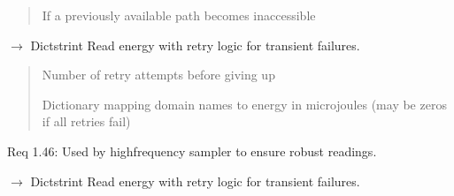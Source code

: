 \documentclass[letterpaper,10pt,english]{sphinxmanual}
\begin{document}
\begin{fulllineitems}
\begin{fulllineitems}
\begin{quote}
\begin{description}
\sphinxAtStartPar
{} \textendash{} If a previously available path becomes inaccessible

\end{description}\end{quote}

\end{fulllineitems}


\begin{fulllineitems}
\label{\detokenize{core.readers.rapl_reader:core.readers.rapl_reader.RAPLReader.read_energy_safe}}
\pysigstartsignatures
\pysiglinewithargsret
{}
{}
{{ $\rightarrow$ Dict\DUrole{p}{{[}}strint\DUrole{p}{{]}}}}
\pysigstopsignatures
\sphinxAtStartPar
Read energy with retry logic for transient failures.
\begin{quote}\begin{description}
\sphinxAtStartPar
{} \textendash{} Number of retry attempts before giving up

\sphinxAtStartPar
Dictionary mapping domain names to energy in microjoules
(may be zeros if all retries fail)

\end{description}\end{quote}

\sphinxAtStartPar
Req 1.46: Used by high\sphinxhyphen{}frequency sampler to ensure robust readings.

\end{fulllineitems}


\begin{fulllineitems}
\label{\detokenize{core.readers.rapl_reader:core.readers.rapl_reader.RAPLReader.read_with_retry}}
\pysigstartsignatures
\pysiglinewithargsret
{}
{}
{{ $\rightarrow$ Dict\DUrole{p}{{[}}strint\DUrole{p}{{]}}}}
\pysigstopsignatures
\sphinxAtStartPar
Read energy with retry logic for transient failures.


\end{fulllineitems}
\end{fulllineitems}
\end{document}
